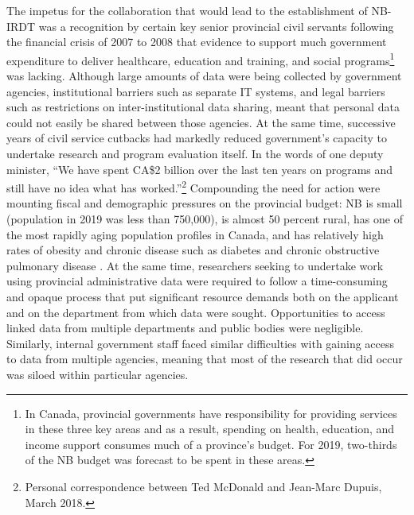 \documentclass[
]{WileySix}
\begin{document}
The impetus for the collaboration that would lead to the establishment of NB-IRDT was a recognition by certain key senior provincial civil servants following the financial crisis of 2007 to 2008 that evidence to support much government expenditure to deliver healthcare, education and training, and social programs\footnote{In Canada, provincial governments have responsibility for providing services in these three key areas and as a result, spending on health, education, and income support consumes much of a province's budget. For 2019, two-thirds of the NB budget was forecast to be spent in these areas.} was lacking. Although large amounts of data were being collected by government agencies, institutional barriers such as separate IT systems, and legal barriers such as restrictions on inter-institutional data sharing, meant that personal data could not easily be shared between those agencies. At the same time, successive years of civil service cutbacks had markedly reduced government's capacity to undertake research and program evaluation itself. In the words of one deputy minister, ``We have spent CA\$2 billion over the last ten years on programs and still have no idea what has worked.''\footnote{Personal correspondence between Ted McDonald and Jean-Marc Dupuis, March 2018.} Compounding the need for action were mounting fiscal and demographic pressures on the provincial budget: NB is small (population in 2019 was less than 750,000), is almost 50 percent rural, has one of the most rapidly aging population profiles in Canada, and has relatively high rates of obesity and chronic disease such as diabetes and chronic obstructive pulmonary disease \citep{statisticscanada2020}. At the same time, researchers seeking to undertake work using provincial administrative data were required to follow a time-consuming and opaque process that put significant resource demands both on the applicant and on the department from which data were sought. Opportunities to access linked data from multiple departments and public bodies were negligible. Similarly, internal government staff faced similar difficulties with gaining access to data from multiple agencies, meaning that most of the research that did occur was siloed within particular agencies.
\end{document}
